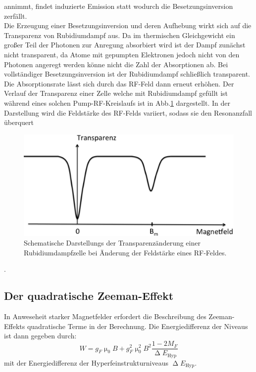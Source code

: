 annimmt, findet induzierte Emission statt wodurch die Besetzungsinversion zerfällt.\\
Die Erzeugung einer Besetzungsinversion und deren Aufhebung wirkt sich auf die Transparenz von Rubidiumdampf aus. Da im thermischen Gleichgewicht ein großer Teil der Photonen zur Anregung absorbiert wird ist der Dampf zunächst nicht transparent, da Atome mit gepumpten Elektronen jedoch nicht von den Photonen angeregt werden könne nicht die Zahl der Absorptionen ab. Bei vollständiger Besetzungsinversion ist der Rubidiumdampf schließlich transparent. Die Absorptionsrate lässt sich durch das RF-Feld dann erneut erhöhen. Der Verlauf der Transparenz einer Zelle welche mit Rubidiumdampf gefüllt ist während eines solchen Pump-RF-Kreislaufs ist in Abb.\ref{Kreislauf} dargestellt.  In der Darstellung wird die Feldstärke des RF-Felds variiert, sodass sie den Resonanzfall überquert
\begin{figure}
  \centering
  \includegraphics[width=\textwidth]{Bilder/Beispiel}
  \caption{Schematische Darstellungs der Transparenzänderung einer Rubidiumdampfzelle bei Änderung der Feldstärke eines RF-Feldes. \cite{Anleitung}}
  \label{Kreislauf}
\end{figure}.
\subsection{Der quadratische Zeeman-Effekt}
In Anweseheit starker Magnetfelder erfordert die Beschreibung des Zeeman-Effekts quadratische Terme in der Berechnung. Die Energiedifferenz der Niveaus ist dann gegeben durch:
\begin{equation}
  W = g_F\upmu_\text{0}B+g^2_F\upmu^2_\text{0}B^2\frac{1-2M_F}{\upDelta E_\text{Hyp}}
\end{equation}
mit der Energiedifferenz der Hyperfeinstrukturniveaus $\upDelta E_\text{Hyp}$.
